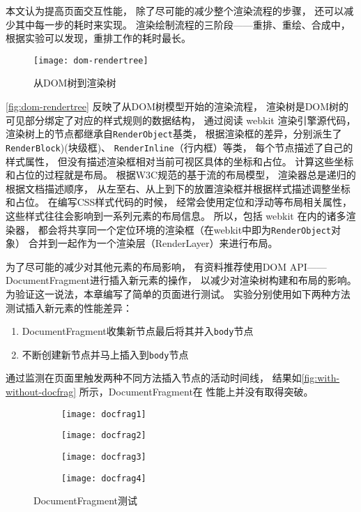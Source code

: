 本文认为提高页面交互性能，
除了尽可能的减少整个渲染流程的步骤，
还可以减少其中每一步的耗时来实现。
渲染绘制流程的三阶段——重排、重绘、合成中，
根据实验可以发现，重排工作的耗时最长。

\begin{figure}[htbp]
	\centering
	\texttt{[image: dom-rendertree]}
	\caption{从DOM树到渲染树}\label{fig:dom-rendertree}
\end{figure}

\autoref{fig:dom-rendertree} 反映了从DOM树模型开始的渲染流程\cite{webkit2014}，
渲染树是DOM树的可见部分绑定了对应的样式规则的数据结构，
通过阅读 webkit 渲染引擎源代码，
渲染树上的节点都继承自\texttt{RenderObject}基类，
根据渲染框的差异，分别派生了
\texttt{RenderBlock})(块级框)、
\texttt{RenderInline}（行内框）等类，
每个节点描述了自己的样式属性，
但没有描述渲染框相对当前可视区具体的坐标和占位。
计算这些坐标和占位的过程就是布局。
根据W3C规范的基于流的布局模型，
渲染器总是递归的根据文档描述顺序，
从左至右、从上到下的放置渲染框并根据样式描述调整坐标和占位。
在编写CSS样式代码的时候，
经常会使用定位和浮动等布局相关属性，
这些样式往往会影响到一系列元素的布局信息。
所以，包括 webkit 在内的诸多渲染器，
都会将共享同一个定位环境的渲染框（在webkit中即为\texttt{RenderObject}对象）
合并到一起作为一个渲染层（RenderLayer）来进行布局。

为了尽可能的减少对其他元素的布局影响，
有资料\cite{docfrag}推荐使用DOM API——DocumentFragment进行插入新元素的操作，
以减少对渲染树构建和布局的影响。
为验证这一说法，本章编写了简单的页面进行测试。
实验分别使用如下两种方法测试插入新元素的性能差异：
\begin{enumerate}
    \item DocumentFragment收集新节点最后将其并入\texttt{body}节点
    \item 不断创建新节点并马上插入到\texttt{body}节点
\end{enumerate}
通过监测在页面里触发两种不同方法插入节点的活动时间线，
结果如\autoref{fig:with-without-docfrag} 所示，DocumentFragment在
性能上并没有取得突破。

\begin{figure}[htbp]
	\centering
	\begin{subfigure}[b]{.4\textwidth}
		\centering
		\texttt{[image: docfrag1]}
		\caption{}\label{}
	\end{subfigure}
	\begin{subfigure}[b]{.4\textwidth}
		\centering
		\texttt{[image: docfrag2]}
		\caption{}\label{}
	\end{subfigure}
	\begin{subfigure}[b]{.4\textwidth}
		\centering
		\texttt{[image: docfrag3]}
		\caption{}\label{}
	\end{subfigure}
	\begin{subfigure}[b]{.4\textwidth}
		\centering
		\texttt{[image: docfrag4]}
		\caption{}\label{}
	\end{subfigure}
	\caption{DocumentFragment测试}\label{fig:with-without-docfrag}
\end{figure}

